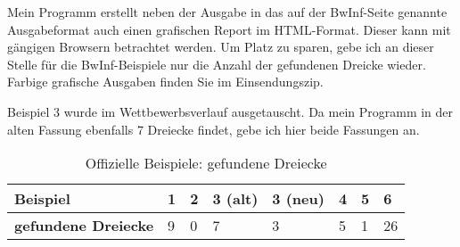 Mein Programm erstellt neben der Ausgabe in das auf der BwInf-Seite genannte
Ausgabeformat auch einen grafischen Report im HTML-Format.
Dieser kann mit gängigen Browsern betrachtet werden.
Um Platz zu sparen, gebe ich an dieser Stelle für die BwInf-Beispiele nur die Anzahl
der gefundenen Dreicke wieder. Farbige grafische Ausgaben finden Sie im Einsendungszip.

Beispiel 3 wurde im Wettbewerbsverlauf ausgetauscht. Da mein Programm in der alten
Fassung ebenfalls 7 Dreiecke findet, gebe ich hier beide Fassungen an.

\begin{table}[h]
    \centering
    \begin{tabular}{l|lllllll}
        \textbf{Beispiel}           & 1 & 2 & 3 (alt) & 3 (neu) & 4 & 5 & 6 \\ \hline
        \textbf{gefundene Dreiecke} & 9 & 0 & 7       & 3 & 5 & 1 & 26
    \end{tabular}
    \caption{Offizielle Beispiele: gefundene Dreiecke}
    \label{tab:bwinfbeispiele}
\end{table}
